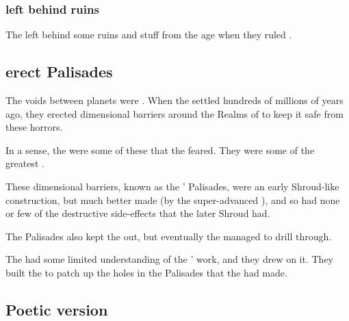 \subsubsection{\XzaiShanns left behind ruins}
The \xss{} left behind some ruins and stuff from the age when they ruled \Miith{}. 










\subsection{\Voyagers erect Palisades}
The voids between planets were .
When the \voyagers settled \Miith hundreds of millions of years ago, they erected dimensional barriers around the Realms of \Miith to keep it safe from these horrors.

In a sense, the \xss were some of these  that the \voyagers feared.
They were some of the greatest .

These dimensional barriers, known as the \Voyagers' Palisades, were an early Shroud-like construction, but much better made (by the super-advanced \voyagers), and so had none or few of the destructive side-effects that the later Shroud had.

The Palisades also kept the \banes out, but eventually the \banes managed to drill through.

The \ophidians had some limited understanding of the \voyagers' work, and they drew on it.
They built the  to patch up the holes in the Palisades that the \banes had made.









\subsection{Poetic version}
